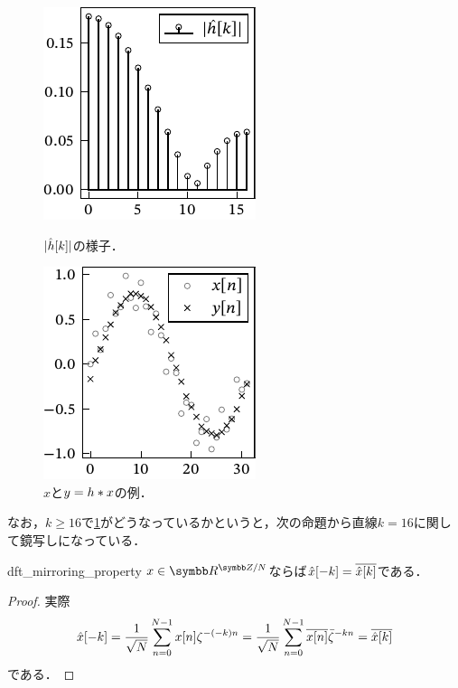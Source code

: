 \documentclass[../../main]{subfiles}
\begin{document}
\begin{figure}[htbp]
  \begin{minipage}{\linewidth/2}
    \centering
    \includegraphics{figures/filter_characteristics.pdf}
    \caption{\(\lvert\hat{h}[k]\rvert\)の様子．}
    \label{figure:filter_characteristics}
    \end{minipage}%
  \begin{minipage}{\linewidth/2}
    \centering
    \includegraphics{figures/filtering.pdf}
    \caption{\(x\)と\(y=h\ast x\)の例．}
  \end{minipage}
\end{figure}

なお，\(k\geq 16\)で\cref{figure:filter_characteristics}がどうなっているかというと，次の命題から直線\(k=16\)に関して鏡写しになっている．

\begin{proposition}{}{dft_mirroring_property}
  \(x\in\cycles{\numset{R}}{N}\)ならば\(\hat{x}[-k]=\conj*{\hat{x}[k]}\)である．
\end{proposition}

\begin{proof}
  実際
  \[
    \hat{x}[-k] = \frac{1}{\sqrt{N}}\sum_{n=0}^{N-1}x[n]\zeta^{-(-k)n}
    = \frac{1}{\sqrt{N}}\sum_{n=0}^{N-1}\conj*{x[n]}\conj{\zeta}^{-kn}
    = \conj*{\hat{x}[k]}
  \]
  である．
\end{proof}
\end{document}
